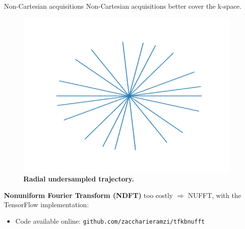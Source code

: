 \begin{frame}{Non-Cartesian acquisitions}
    Non-Cartesian acquisitions better cover the k-space.
    \pause
    \vspace{-1ex}
    \begin{figure}
        \centering
        \includegraphics[height=0.5\textheight]{Figures/dl_mri_figures/radial_trajectory.png}
        \caption{\textbf{Radial undersampled trajectory.}}
    \end{figure}
    \pause

    \textbf{Nonuniform Fourier Transform (NDFT)} too costly $\Rightarrow$ NUFFT, with the TensorFlow implementation:
    \begin{itemize}
        \item {} Code available online: \texttt{github.com/zaccharieramzi/tfkbnufft}
    \end{itemize}
\end{frame}

